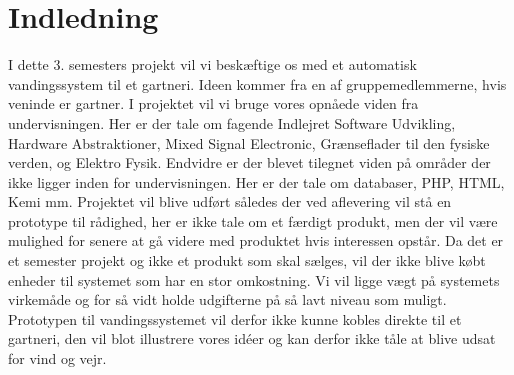 \chapter{Indledning}

I dette 3. semesters projekt vil vi beskæftige os med et automatisk vandingssystem til et gartneri. Ideen kommer fra en af gruppemedlemmerne, hvis veninde er gartner. I projektet vil vi bruge vores opnåede viden fra undervisningen. Her er der tale om fagende Indlejret Software Udvikling, Hardware Abstraktioner, Mixed Signal Electronic, Grænseflader til den fysiske verden, og Elektro Fysik. Endvidre er der blevet tilegnet viden på områder der ikke ligger inden for undervisningen. Her er der tale om databaser, PHP, HTML, Kemi mm. Projektet vil blive udført således der ved aflevering vil stå en prototype til rådighed, her er ikke tale om et færdigt produkt, men der vil være mulighed for senere at gå videre med produktet hvis interessen opstår. Da det er et semester projekt og ikke et produkt som skal sælges, vil der ikke blive købt enheder til systemet som har en stor omkostning. Vi vil ligge vægt på systemets virkemåde og for så vidt holde udgifterne på så lavt niveau som muligt. Prototypen til vandingssystemet vil derfor ikke kunne kobles direkte til et gartneri, den vil blot illustrere vores idéer og kan derfor ikke tåle at blive udsat for vind og vejr. 










   